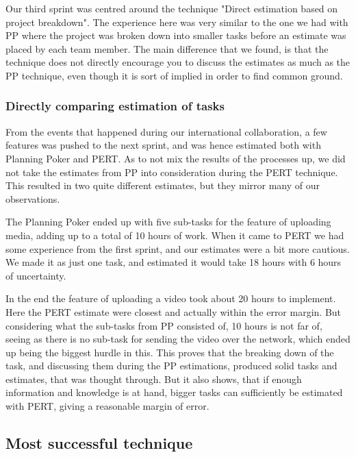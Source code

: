 Our third sprint was centred around the technique "Direct estimation based on project breakdown". The experience here was very similar to the one we had with PP where the project was broken down into smaller tasks before an estimate was placed by each team member. The main difference that we found, is that the technique does not directly encourage you to discuss the estimates as much as the PP technique, even though it is sort of implied in order to find common ground.

\subsubsection{Directly comparing estimation of tasks}

From the events that happened during our international collaboration, a few features was pushed to the next sprint, and was hence estimated both with Planning Poker and PERT. As to not mix the results of the processes up, we did not take the estimates from PP into consideration during the PERT technique. This resulted in two quite different estimates, but they mirror many of our observations.

The Planning Poker ended up with five sub-tasks for the feature of uploading media, adding up to a total of 10 hours of work. When it came to PERT we had some experience from the first sprint, and our estimates were a bit more cautious. We made it as just one task, and estimated it would take 18 hours with 6 hours of uncertainty.

In the end the feature of uploading a video took about 20 hours to implement. Here the PERT estimate were closest and actually within the error margin. But considering what the sub-tasks from PP consisted of, 10 hours is not far of, seeing as there is no sub-task for sending the video over the network, which ended up being the biggest hurdle in this. This proves that the breaking down of the task, and discussing them during the PP estimations, produced solid tasks and estimates, that was thought through. But it also shows, that if enough information and knowledge is at hand, bigger tasks can sufficiently be estimated with PERT, giving a reasonable margin of error. 

\subsection{Most successful technique}

















